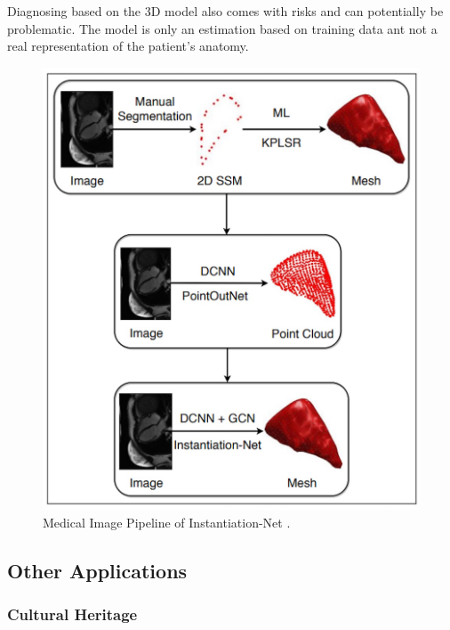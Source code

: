 Diagnosing based on the 3D model also comes with risks and can potentially be problematic. The model is only an estimation based on training data ant not a real representation of the patient's anatomy.
\begin{figure}
    \centering
    \includegraphics[width=0.7\linewidth]{images/medical.jpg}
    \caption{Medical Image Pipeline of Instantiation-Net \autocite{wang_instantiation-net_2019}.}
    \label{fig:medical}
\end{figure}

\subsection{Other Applications}

\subsubsection{Cultural Heritage}



